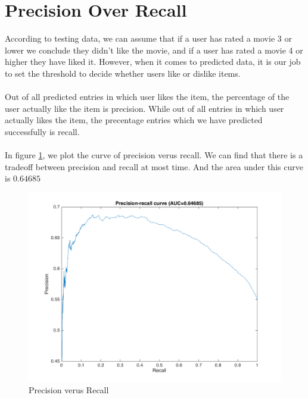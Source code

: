 \documentclass{article}
\begin{document}
\section{Precision Over Recall}
According to testing data, we can assume that if a user has rated a movie 3 or lower we conclude they didn't like the movie, and if a user has rated a movie 4 or higher they have liked it. However, when it comes to predicted data, it is our job to set the threshold to decide whether users like or dislike items.\\
\\
Out of all predicted entries in which user likes the item, the percentage of the user actually like the item is precision. While out of all entries in which user actually likes the item, the precentage entries which we have predicted successfully is recall.\\
\\
In figure \ref{fig:problem3}, we plot the curve of precision verus recall. We can find that there is a tradeoff between precision and recall at most time. And the area under this curve is $0.64685$
\begin{figure}[htbp]
\centering
\includegraphics[width=.6\textwidth]{problem3.png}
\caption{Precision verus Recall}
\label{fig:problem3}
\end{figure}
\end{document}
